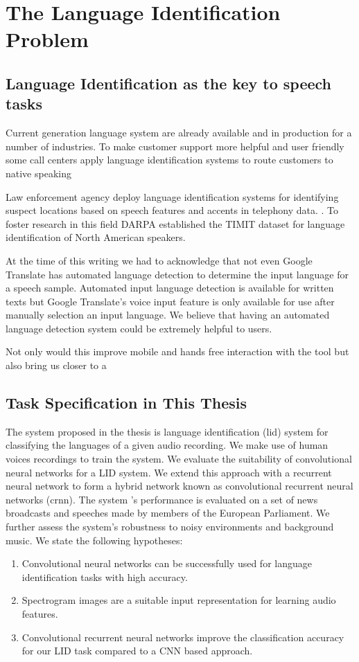 \section{The Language Identification Problem}
\label{sec:lid}

\subsection{Language Identification as the key to speech tasks}

Current generation language system are already available and in production for a number of industries. To make customer support more helpful and user friendly some call centers apply language identification systems to route customers to native speaking

Law enforcement agency deploy language identification systems for identifying suspect locations based on speech features and accents in telephony data. . To foster research in this field DARPA established the TIMIT dataset for language identification of North American speakers. 

At the time of this writing we had to acknowledge that not even Google Translate has automated language detection to determine the input language for a speech sample. Automated input language detection is available for written texts but Google Translate's voice input feature is only available for use after manually selection an input language. We believe that having an automated language detection system could be extremely helpful to users. 

Not only would this improve mobile and hands free interaction with the tool but also bring us closer to a



\subsection{Task Specification in This Thesis}
The system proposed in the thesis is language identification (\ac{lid}) system for classifying the languages of a given audio recording. We make use of human voices recordings to train the  system. We evaluate the suitability of convolutional neural networks for a LID system. We extend this approach with a recurrent neural network to form a hybrid network known as convolutional recurrent neural networks (\ac{crnn}). The system 's performance is evaluated on a set of news broadcasts and speeches made by members of the European Parliament. We further assess the system's robustness to noisy environments and background music. We state the following hypotheses:

\begin{enumerate}
	\item Convolutional neural networks can be successfully used for language identification tasks with high accuracy.
	\item Spectrogram images are a suitable input representation for learning audio features.
	\item Convolutional recurrent neural networks improve the classification accuracy for our LID task compared to a CNN based approach.
\end{enumerate}



